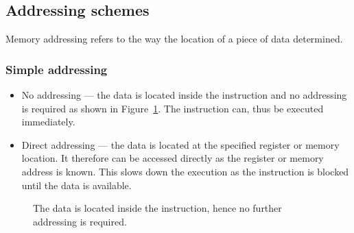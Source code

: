 \documentclass{report}
\begin{document}
\subsection{Addressing schemes}

Memory addressing refers to the way the location of a piece of data determined.

\subsubsection{Simple addressing}

\begin{itemize}
    \item{No addressing --- the data is located inside the instruction and no
        addressing is required as shown in Figure~\ref{fig:no-addressing}. The
        instruction can, thus be executed immediately.}
    \item{Direct addressing --- the data is located at the specified register or
        memory location. It therefore can be accessed directly as the register
        or memory address is known. This slows down the execution as the
        instruction is blocked until the data is available.}
\end{itemize}

\begin{figure}[H]
\centering
{}
\caption{The data is located inside the instruction, hence no further
          addressing is required.}\label{fig:no-addressing}
\end{figure}
\end{document}
